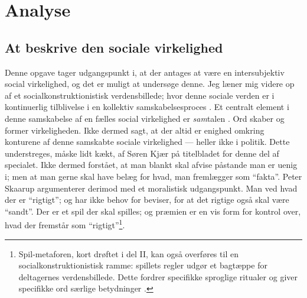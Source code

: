 \renewcommand*{\afterpartskip}{
\vfil
\begin{epigraphs}
\qitem{\itshape
“Jo, hvis dét skal kaldes Fakta, saa benægter a Fakta!”
}{Folketingsmedlem Søren Kjær, i debat med Carl Steen Andersen Bille}
\qitem{\itshape
Politik skal ikke videnskabeliggøres. Der findes ikke noget facit i politik – kun følelser og holdninger. Begreber som sandt og falsk eller godt og ondt har ganske enkelt ikke hjemme i det politiske rum. 
}{Peter Skaarup, i et ugebrev for Dansk Folkeparti, \citeyear{skaarupPolitikErForst2017}}
\end{epigraphs}}

\part{Analyse}\label{part:analysis}

\chapter{At beskrive den sociale virkelighed}

Denne opgave tager udgangspunkt i, at der antages at være en intersubjektiv social virkelighed, og det er muligt at undersøge denne.
Jeg læner mig videre op af et socialkonstruktionistisk verdensbillede; hvor denne sociale verden er i kontinuerlig tilblivelse i en kollektiv samskabelsesproces \autocite{gergenSocialkonstruktionismeOgUddannelse2017}.
Et centralt element i denne samskabelse af en fælles social virkelighed er \textit{sam}talen \autocite[s. 15f]{gergenSocialkonstruktionismeOgUddannelse2017}.
Ord skaber og former virkeligheden.
Ikke dermed sagt, at der altid er enighed omkring konturene af denne samskabte sociale virkelighed — heller ikke i politik.
Dette understreges, måske lidt kækt, af Søren Kjær på titelbladet for denne del af specialet.
Ikke dermed forstået, at man blankt skal afvise påstande man er uenig i; men at man gerne skal have belæg for hvad, man fremlægger som “fakta”.
Peter Skaarup argumenterer derimod med et moralistisk udgangspunkt.
Man ved hvad der er “rigtigt”; og har ikke behov for beviser, for at det rigtige også skal være “sandt”.
Der er et spil der skal spilles; og præmien er en vis form for kontrol over, hvad der fremstår som “rigtigt”\footnote{
    Spil-metaforen, kort drøftet i del II, kan også overføres til en socialkonstruktionistisk ramme:
spillets regler udgør et bagtæppe for deltagernes verdensbillede.
Dette fordrer specifikke sproglige ritualer og giver specifikke ord særlige betydninger \autocite[s. 24f]{gergenSocialkonstruktionismeOgUddannelse2017}.}.

